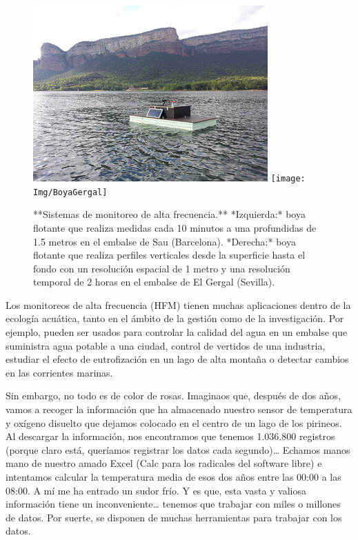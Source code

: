 \documentclass[
]{book}
\begin{document}
\begin{figure}

{\centering \includegraphics[width=0.49\linewidth,height=0.2\textheight]{Img/foto-sau} \texttt{[image: Img/BoyaGergal]} 

}

\caption{**Sistemas de monitoreo de alta frecuencia.** *Izquierda:* boya flotante que realiza medidas cada 10 minutos a una profundidas de 1.5 metros en el embalse de Sau (Barcelona). *Derecha:* boya flotante que realiza perfiles verticales desde la superficie hasta el fondo con un resolución espacial de 1 metro y una resolución temporal de 2 horas en el embalse de El Gergal (Sevilla).}\label{fig:unnamed-chunk-1}
\end{figure}

Los monitoreos de alta frecuencia (HFM) tienen muchas aplicaciones dentro de la ecología acuática, tanto en el ámbito de la gestión como de la investigación. Por ejemplo, pueden ser usados para controlar la calidad del agua en un embalse que suministra agua potable a una ciudad, control de vertidos de una industria, estudiar el efecto de eutrofización en un lago de alta montaña o detectar cambios en las corrientes marinas.

Sin embargo, no todo es de color de rosas. Imaginaos que, después de dos años, vamos a recoger la información que ha almacenado nuestro sensor de temperatura y oxígeno disuelto que dejamos colocado en el centro de un lago de los pirineos. Al descargar la información, nos encontramos que tenemos 1.036.800 registros (porque claro está, queríamos registrar los datos cada segundo)\ldots{} Echamos manos mano de nuestro amado Excel (Calc para los radicales del software libre) e intentamos calcular la temperatura media de esos dos años entre las 00:00 a las 08:00. A mí me ha entrado un sudor frío. Y es que, esta vasta y valiosa información tiene un inconveniente\ldots{} tenemos que trabajar con miles o millones de datos. Por suerte, se disponen de muchas herramientas para trabajar con los datos.
\end{document}
